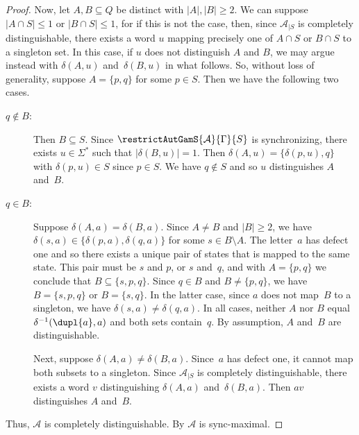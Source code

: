 \begin{proof}
    Now, let $A, B \subseteq Q$ be distinct with $|A|,|B| \ge 2$.    
    We can suppose $|A \cap S| \le 1$ or $|B \cap S| \le 1$,
    for if this is not the case,
    then, since $\mathcal A_{|S}$ is completely distinguishable,
    there exists a word $u$ mapping precisely one 
    of $A\cap S$ or $B \cap S$ to a singleton set.   
    In this case, if 
    $u$ does not distinguish $A$ and $B$, 
    we may argue instead with $\delta(A, u)$ and~$\delta(B, u)$ in what follows.
    So, without loss of generality, suppose $A = \{p, q\}$ for some $p \in S$.
    Then we have the following two cases.
    
    \begin{description}
    \item[$q \notin B$:] Then $B \subseteq S$. 
    Since $\restrictAutGamS{\mathcal A}{\Gamma}{S}$ is synchronizing,
    there exists $u \in \Sigma^*$ such that $|\delta(B, u)| = 1$.
        Then  $\delta(A, u) = \{\delta(p, u), q\}$
        with $\delta(p, u) \in S$ since $p \in S$.
        We have $q \notin S$ and so $u$ distinguishes $A$ and~$B$.
        
    \item[$q \in B$:] Suppose $\delta(A, a) = \delta(B, a)$.
    Since $A \ne B$ and $|B| \ge 2$,
    we have $\delta(s, a) \in \{\delta(p, a), \delta(q, a)\}$
    for some $s \in B \setminus A$. 
    The letter~$a$ has defect one and so there exists
    a unique pair of states that is mapped to the same state.
    This pair must be $s$ and $p$, or $s$ and~$q$,
    and with $A = \{p,q\}$ we conclude that $B \subseteq \{s, p, q\}$.
    Since $q \in B$ and $B \ne \{p,q\}$,
    we have $B = \{s,p,q\}$ or $B = \{s, q\}$.
    In the latter case, since $a$ does not map~$B$ to a singleton,
    we have $\delta(s, a) \ne \delta(q, a)$.    
    In all cases, neither $A$ nor $B$ equal $\delta^{-1}(\dupl{a}, a)$
    and both sets contain~$q$. By assumption, $A$ and~$B$ are distinguishable.    
        
    Next, suppose $\delta(A, a) \ne \delta(B, a)$.
    Since~$a$ has defect one, it cannot map both
    subsets to a singleton. Since $\mathcal A_{|S}$ is completely distinguishable,
    there exists a word $v$ distinguishing $\delta(A, a)$
    and~$\delta(B, a)$. Then $av$ distinguishes $A$ and~$B$.
    \end{description}
    
    Thus, $\mathcal A$ is completely distinguishable.    
    By 
    $\mathcal A$ is sync-maximal.
\end{proof}

